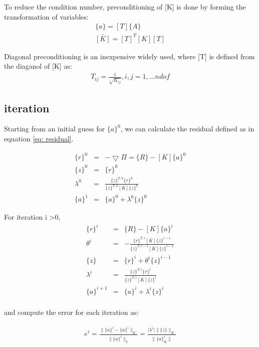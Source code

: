 \documentclass[paper=a4, fontsize=11pt]{article} %
\begin{document}
To reduce the condition number, preconditioning of [K] is done by forming the transformation of variables:
\begin{eqnarray}
\{a\} = [T] \{ A\} \nonumber\\
\bar{[K]} = [T] ^T [K] [T] 
\end{eqnarray} 

Diagonal preconditioning is an inexpensive widely used, where [T] is defined from the diaganol of [K] as:
\begin{eqnarray}
T_{ij} = \frac{1} { \sqrt{ K_{ij} } }, i,j = 1, ... ndof 
\end{eqnarray}

\subsection{iteration}
Starting from an initial guess for $\{a\}^0$, we can calculate the residual defined as in equation \ref{eq: residual}.

\begin{eqnarray}
\label{eq: residual}
\{r\}^0 &=& - \bigtriangledown \Pi = \{R\} - [K] \{a\}^0 \nonumber\\
\{z\}^0 &=& \{r\}^0 \nonumber\\
\lambda ^0 &=& \frac{ \{z\}^{T,0} \{r\}^0} { \{z\}^{T,0}[K]\{z\}^0} \nonumber\\
\{a\}^{1} &=& \{a\}^0 + \lambda^0 \{z\}^0
\end{eqnarray}

For iteration i >0, 
\begin{eqnarray}
\{r\}^i &=& \{R\} - [K] \{a\}^i \nonumber\\
\theta^i &=& - \frac{\{r\}^{T,i} [K] \{z\} ^ {i-1}} {\{z\} ^{T,i-1} [K] \{z\}^{i-1} }\nonumber\\
\{z\} &=& \{r\} ^i + \theta ^i \{z\} ^{i-1} \nonumber\\
\lambda ^i &=& \frac{ \{z\}^{T,i} \{r\}^i} { \{z\}^{T,i}[K]\{z\}^i} \nonumber\\
\{a\} ^{i+1} &=& \{a\} ^i + \lambda ^i \{z\} ^i  \nonumber\\
\end{eqnarray}

and compute the error for each iteration as:

\begin{eqnarray}
e^i = \frac{\|\{a\}^i - \{a\}^i \| _K } { \| \{ a\}^i \| _k} = \frac{ \mid \lambda ^i \mid \| \{z\} \| _K }{ \| \{ a\} ^i _K \|} 
\end{eqnarray}
\end{document}
